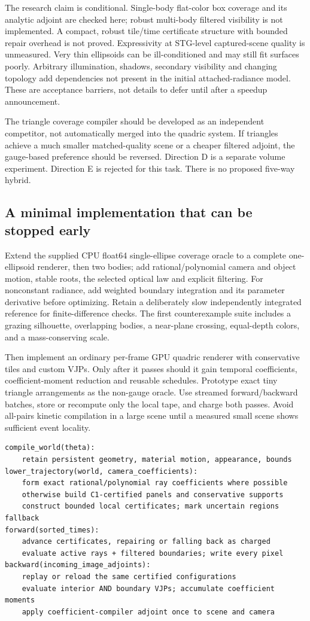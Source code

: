 \documentclass[10pt,letterpaper]{article}
\theoremstyle{remark}\newtheorem{counterexample}[proposition]{Counterexample}
\begin{document}
The research claim is conditional. Single-body flat-color box coverage and its analytic adjoint are checked here; robust multi-body filtered visibility is not implemented. A compact, robust tile/time certificate structure with bounded repair overhead is not proved. Expressivity at STG-level captured-scene quality is unmeasured. Very thin ellipsoids can be ill-conditioned and may still fit surfaces poorly. Arbitrary illumination, shadows, secondary visibility and changing topology add dependencies not present in the initial attached-radiance model. These are acceptance barriers, not details to defer until after a speedup announcement.

The triangle coverage compiler should be developed as an independent competitor, not automatically merged into the quadric system. If triangles achieve a much smaller matched-quality scene or a cheaper filtered adjoint, the gauge-based preference should be reversed. Direction D is a separate volume experiment. Direction E is rejected for this task. There is no proposed five-way hybrid.

\subsection{A minimal implementation that can be stopped early}
Extend the supplied CPU float64 single-ellipse coverage oracle to a complete one-ellipsoid renderer, then two bodies; add rational/polynomial camera and object motion, stable roots, the selected optical law and explicit filtering. For nonconstant radiance, add weighted boundary integration and its parameter derivative before optimizing. Retain a deliberately slow independently integrated reference for finite-difference checks. The first counterexample suite includes a grazing silhouette, overlapping bodies, a near-plane crossing, equal-depth colors, and a mass-conserving scale.

Then implement an ordinary per-frame GPU quadric renderer with conservative tiles and custom VJPs. Only after it passes should it gain temporal coefficients, coefficient-moment reduction and reusable schedules. Prototype exact tiny triangle arrangements as the non-gauge oracle. Use streamed forward/backward batches, store or recompute only the local tape, and charge both passes. Avoid all-pairs kinetic compilation in a large scene until a measured small scene shows sufficient event locality.

\begin{lstlisting}
compile_world(theta):
    retain persistent geometry, material motion, appearance, bounds
lower_trajectory(world, camera_coefficients):
    form exact rational/polynomial ray coefficients where possible
    otherwise build C1-certified panels and conservative supports
    construct bounded local certificates; mark uncertain regions fallback
forward(sorted_times):
    advance certificates, repairing or falling back as charged
    evaluate active rays + filtered boundaries; write every pixel
backward(incoming_image_adjoints):
    replay or reload the same certified configurations
    evaluate interior AND boundary VJPs; accumulate coefficient moments
    apply coefficient-compiler adjoint once to scene and camera
\end{lstlisting}
\end{document}
